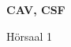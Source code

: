 \documentclass[a4paper]{article}
\begin{document}
\printGenericVSLHeader
\begin{center}
\begin{vsltext}{3cm}{4cm}

   \vspace{0.5cm} 

    \textbf{CAV, CSF} 

    \vspace{1.5cm}

    Hörsaal 1

\end{vsltext}

\end{center}
\end{document}
